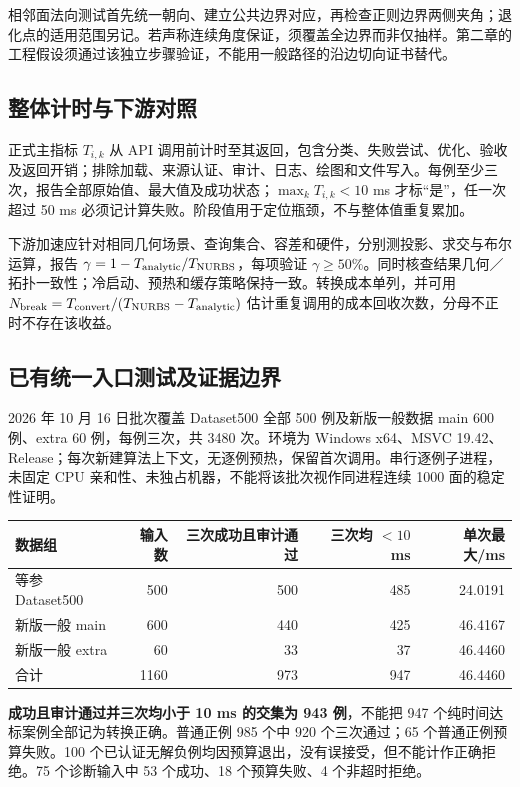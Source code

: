 \documentclass[UTF8,zihao=5,fontset=windows,a4paper]{ctexart}
\begin{document}
相邻面法向测试首先统一朝向、建立公共边界对应，再检查正则边界两侧夹角；退化点的适用范围另记。若声称连续角度保证，须覆盖全边界而非仅抽样。第二章的工程假设须通过该独立步骤验证，不能用一般路径的沿边切向证书替代。

\subsection{整体计时与下游对照}
正式主指标 $T_{i,k}$ 从 API 调用前计时至其返回，包含分类、失败尝试、优化、验收及返回开销；排除加载、来源认证、审计、日志、绘图和文件写入。每例至少三次，报告全部原始值、最大值及成功状态；$\max_kT_{i,k}<10$ ms 才标“是”，任一次超过 50 ms 必须记计算失败。阶段值用于定位瓶颈，不与整体值重复累加。

下游加速应针对相同几何场景、查询集合、容差和硬件，分别测投影、求交与布尔运算，报告 $\gamma=1-T_{\rm analytic}/T_{\rm NURBS}$，每项验证 $\gamma\ge50\%$。同时核查结果几何／拓扑一致性；冷启动、预热和缓存策略保持一致。转换成本单列，并可用 $N_{\rm break}=T_{\rm convert}/(T_{\rm NURBS}-T_{\rm analytic})$ 估计重复调用的成本回收次数，分母不正时不存在该收益。

\newpage
\subsection{已有统一入口测试及证据边界}
2026 年 10 月 16 日批次覆盖 Dataset500 全部 500 例及新版一般数据 main 600 例、extra 60 例，每例三次，共 3480 次。环境为 Windows x64、MSVC 19.42、Release；每次新建算法上下文，无逐例预热，保留首次调用。串行逐例子进程，未固定 CPU 亲和性、未独占机器，不能将该批次视作同进程连续 1000 面的稳定性证明。
\begin{center}\small\renewcommand{\arraystretch}{1.2}
\begin{tabularx}{\linewidth}{@{}Yrrrr@{}}\toprule
数据组 & 输入数 & 三次成功且审计通过 & 三次均 $<10$ ms & 单次最大/ms\\\midrule
等参 Dataset500 & 500 & 500 & 485 & 24.0191\\
新版一般 main & 600 & 440 & 425 & 46.4167\\
新版一般 extra & 60 & 33 & 37 & 46.4460\\\midrule
合计 & 1160 & 973 & 947 & 46.4460\\\bottomrule
\end{tabularx}
\end{center}
\textbf{成功且审计通过并三次均小于 10 ms 的交集为 943 例}，不能把 947 个纯时间达标案例全部记为转换正确。普通正例 985 个中 920 个三次通过；65 个普通正例预算失败。100 个已认证无解负例均因预算退出，没有误接受，但不能计作正确拒绝。75 个诊断输入中 53 个成功、18 个预算失败、4 个非超时拒绝。
\end{document}
